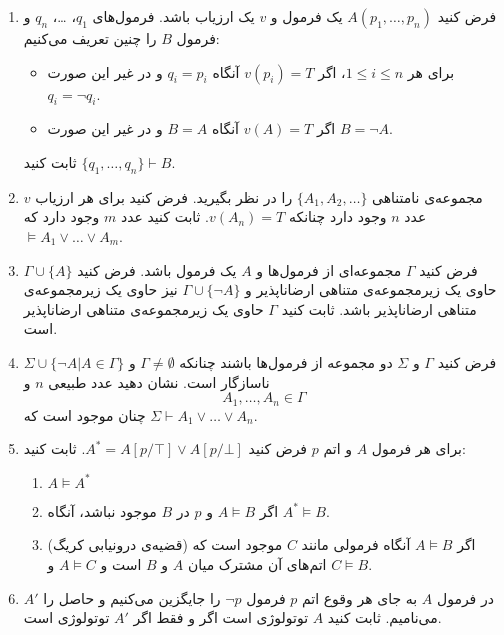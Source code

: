 \documentclass[12pt, 14paper]{article}
\begin{document}
\begin{enumerate}
\item
فرض کنید
$A(p_1,\ldots,p_n)$
یک فرمول و $v$ یک ارزیاب باشد. فرمول‌های $q_1$، \ldots، $q_n$ و فرمول $B$ را چنین تعریف می‌کنیم:
\begin{itemize}
\item
برای هر $1\leq i\leq n$، اگر $v(p_i)=T$ آنگاه $q_i=p_i$ و در غیر این صورت $q_i=\neg q_i$.

\item
اگر $v(A)=T$ آنگاه $B=A$ و در غیر این صورت $B=\neg A$.
\end{itemize}
ثابت کنید
$\{q_1,\ldots,q_n\}\vdash B$.

\item
مجموعه‌ی نامتناهی
$\{A_1,A_2,\ldots\}$
را در نظر بگیرید. فرض کنید برای هر ارزیاب $v$ عدد $n$ وجود دارد چنانکه $v(A_n)=T$. ثابت کنید عدد $m$ وجود دارد که
$\models A_1\vee\ldots\vee A_m$.

\item
فرض کنید $\Gamma$ مجموعه‌ای از فرمول‌ها و $A$ یک فرمول باشد. فرض کنید $\Gamma\cup \{A\}$ حاوی یک زیرمجموعه‌ی متناهی ارضاناپذیر و $\Gamma\cup\{\neg A\}$ نیز حاوی یک زیرمجموعه‌ی متناهی ارضاناپذیر باشد. ثابت کنید $\Gamma$ حاوی یک زیرمجموعه‌ی متناهی ارضاناپذیر است.

\item
فرض کنید $\Gamma$ و $\Sigma$ دو مجموعه از فرمول‌ها باشند چنانکه $\Gamma\neq\emptyset$ و
$\Sigma\cup\{\neg A|A\in\Gamma\}$
ناسازگار است. نشان دهید عدد طبیعی $n$ و
$$
A_1,\ldots,A_n\in\Gamma
$$
چنان موجود است که
$\Sigma\vdash A_1\vee\ldots\vee A_n$.

\item
برای هر فرمول $A$ و اتم $p$ فرض کنید
$A^*=A[p/\top]\vee A[p/\bot]$.
ثابت کنید:
\begin{enumerate}
\item
$A\models A^*$
\item
اگر
$A\models B$
و $p$ در $B$ موجود نباشد، آنگاه
$A^*\models B$.
\item
(قضیه‌ی درونیابی کریگ) اگر
$A\models B$
آنگاه فرمولی مانند $C$ موجود است که اتم‌های آن مشترک میان $A$ و $B$ است و $A\models C$ و $C\models B$.
\end{enumerate}

\item
در فرمول $A$ به جای هر وقوع اتم $p$ فرمول $\neg p$ را جایگزین می‌کنیم و حاصل را $A'$ می‌نامیم. ثابت کنید $A$ توتولوژی است اگر و فقط اگر $A'$ توتولوژی است.

\end{enumerate}
\end{document}
